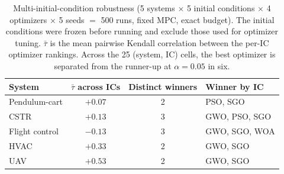\begin{table}[htbp]
\centering
\small
\caption{Multi-initial-condition robustness (5 systems $\times$ 5 initial conditions $\times$ 4 optimizers $\times$ 5 seeds $=$ 500 runs, fixed MPC, exact budget). The initial conditions were frozen before running and exclude those used for optimizer tuning. $\bar\tau$ is the mean pairwise Kendall correlation between the per-IC optimizer rankings. Across the 25 (system, IC) cells, the best optimizer is separated from the runner-up at $\alpha=0.05$ in six.}
\label{tab:multi_ic}
\begin{tabular}{@{}lccl@{}}
\toprule
System & $\bar\tau$ across ICs & Distinct winners & Winner by IC \\
\midrule
Pendulum-cart & $+0.07$ & 2 & PSO, SGO \\
CSTR & $+0.13$ & 3 & GWO, PSO, SGO \\
Flight control & $-0.13$ & 3 & GWO, SGO, WOA \\
HVAC & $+0.33$ & 2 & GWO, SGO \\
UAV & $+0.53$ & 2 & GWO, SGO \\
\bottomrule
\end{tabular}
\end{table}
